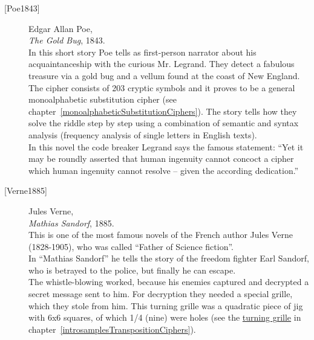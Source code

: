 \begin{description}

\item[\textrm{[Poe1843]}] 
    Edgar Allan Poe, \\
    {\em The Gold Bug}, 1843. \\
    In this short story Poe tells as first-person narrator about his
    acquaintanceship with the curious Mr. Legrand. They detect a fabulous
    treasure via a gold bug and a vellum found at the coast of New England.\\
    The cipher consists of 203 cryptic symbols and it proves to be a
    general monoalphabetic substitution cipher (see
    chapter~\ref{monoalphabeticSubstitutionCiphers}).
    The story tells how they solve the riddle step by step using a combination
    of semantic and syntax analysis (frequency analysis of single letters in
    English texts).\\
    In this novel the code breaker Legrand says the famous statement:
    ``Yet it may be roundly asserted that human ingenuity cannot concoct a
    cipher which human ingenuity cannot resolve -- given the according
    dedication.''\\

\item[\textrm{[Verne1885]}] 
    Jules Verne, \\
    {\em Mathias Sandorf}, 1885. \\
    This is one of the most famous novels of the French author Jules Verne
    (1828-1905), who was called ``Father of Science fiction''.\\
    In ``Mathias Sandorf'' he tells the story of the freedom fighter Earl
    Sandorf, who is betrayed to the police, but finally he can escape.\\
    The whistle-blowing worked, because his enemies captured and decrypted
    a secret message sent to him. For decryption they needed a special
    grille, which they stole from him. This turning grille was a quadratic
    piece of jig with 6x6 squares, of which 1/4 (nine) were holes
    (see the \hyperlink{turning-grille}{turning grille} in 
    chapter~\ref{introsamplesTranspositionCiphers}).\\



\end{description}
